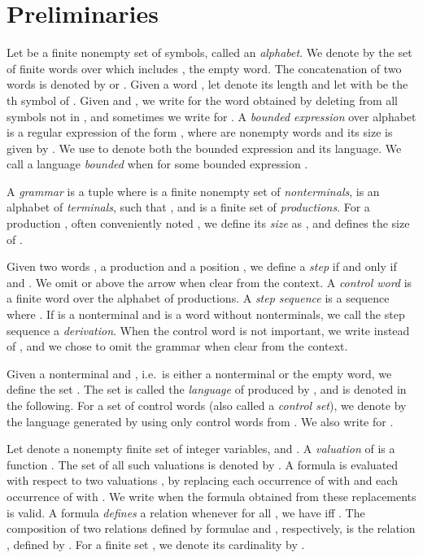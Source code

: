 \documentclass[final]{llncs}
\begin{document}
\section{Preliminaries}\label{sec:prelim}

Let  be a finite nonempty set of symbols, called
an \emph{alphabet}. We denote by  the set of finite words
over  which includes , the empty word. The concatenation
of two words  is denoted by  or .
Given a word , let  denote its length and
let  with  be the th symbol
of . Given  and , we
write  for the word obtained by deleting
from  all symbols not in , and sometimes we
write  for .
A {\em bounded expression}  over alphabet  is a regular
expression of the form , where  are nonempty words and its size is given by .  We use  to denote both the bounded expression and its
language. We call a language  \emph{bounded} when  for some bounded expression .

A \emph{grammar} is a tuple 
where  is a finite nonempty set
of \emph{nonterminals},  is an alphabet of \emph{terminals},
such that , and
 is a finite set
of \emph{productions}. For a production , often conveniently noted , we define its {\em
size} as , and  defines the size of .

Given two words , a production  and a position , we define
a \emph{step}  if and only if 
and . We omit  or  above the arrow when
clear from the context.
A \emph{control word} is a finite word  over the
alphabet of productions. A \emph{step sequence}  is a sequence  where .
If  is a nonterminal and  is a word
without nonterminals, we call the step sequence  a \emph{derivation}. When the control word  is not
important, we write  instead
of , and we chose to omit the grammar 
when clear from the context.


Given a nonterminal  and , i.e.\  is either a nonterminal or the empty word,
we define the set .  The set  is
  called the {\em language} of  produced by , and is denoted
   in the following. For a set  of
  control words (also called a \emph{control set}), we denote by
   the language generated by  using only control words from
. We also write  for 
.

Let  denote a nonempty finite set of integer variables,
and . A \emph{valuation} of
 is a function . The
set of all such valuations is denoted by . A formula
 is evaluated with respect to two valuations
, by replacing each occurrence of
 with  and each occurrence of 
with . We write  when the formula
obtained from these replacements is valid. A formula
 \emph{defines} a relation
 whenever for all , we have
 if{}f . The composition of
two relations  defined by formulae  and
, respectively, is the relation , defined by 
.
For a finite set , we denote its cardinality by .
\end{document}
